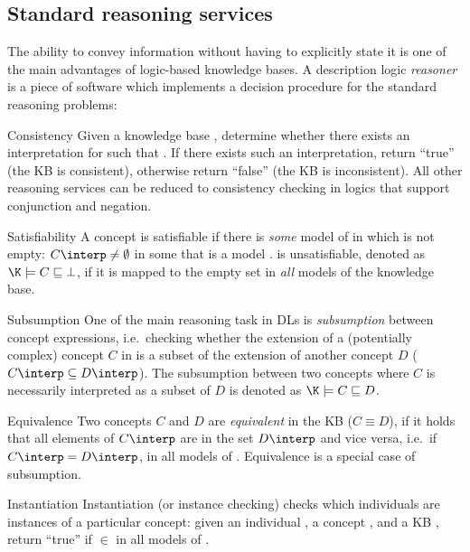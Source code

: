 \subsection{Standard reasoning services}
The ability to convey information without having to explicitly state it is one of the main advantages of logic-based knowledge bases. A description logic \emph{reasoner} is a piece of software which implements a decision procedure for the standard reasoning problems:

\begin{compactdesc}
\item[Consistency] Given a knowledge base \K, determine whether there exists an interpretation \I for \K such that \I \entails \K. If there exists such an interpretation, return \enquote{true} (the KB is consistent), otherwise return \enquote{false} (the KB is inconsistent). All other reasoning services can be reduced to consistency checking in logics that support conjunction and negation.
\item[Satisfiability]
A concept  is satisfiable if there is \emph{some} model of \K in which  is not empty: $C\interp \neq \emptyset$ in some \I that is a model \K.  is unsatisfiable, denoted as $\K \models C \sqsubseteq \bot$, if it is mapped to the empty set in \emph{all} models \I of the knowledge base.
\item[Subsumption]
One of the main reasoning task in DLs is \emph{subsumption} between concept expressions, i.e.\ checking whether the extension of a (potentially complex) concept $C$ in \K is a subset of the extension of another concept $D$ ($C\interp \subseteq D\interp$). The subsumption between two concepts where $C$ is necessarily interpreted as a subset of $D$ is denoted as $\K \models C \sqsubseteq D$.
\item[Equivalence] 
Two concepts $C$ and $D$ are \emph{equivalent} in the KB ($C \equiv D$), if it holds that all elements of $C\interp$ are in the set $D\interp$ and vice versa, i.e.\ if $C\interp = D\interp$, in all models \I of \K. Equivalence is a special case of subsumption.
\item[Instantiation]
Instantiation (or instance checking) checks which individuals are instances of a particular concept: given an individual , a concept , and a KB \K, return \enquote{true} if   $\in$  in all models \I of \K.

\end{compactdesc}


